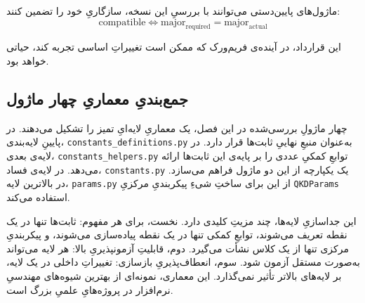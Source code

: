 ماژول‌های پایین‌دستی می‌توانند با بررسیِ این نسخه، سازگاریِ خود را تضمین کنند:
\begin{equation}
	\text{compatible} \iff \text{major}_{\text{required}} = \text{major}_{\text{actual}}
\end{equation}

این قرارداد، در آینده‌ی فریم‌ورک که ممکن است  تغییراتِ اساسی تجربه کند، حیاتی خواهد بود.

\subsection{جمع‌بندیِ معماریِ چهار ماژول}

چهار ماژولِ بررسی‌شده در این فصل، یک معماریِ لایه‌ایِ تمیز را تشکیل می‌دهند. در پایینِ لایه‌بندی، \texttt{constants\_definitions.py} به‌عنوان منبعِ نهاییِ ثابت‌ها قرار دارد. در لایه‌ی بعدی، \texttt{constants\_helpers.py} توابعِ کمکیِ عددی را بر پایه‌ی این ثابت‌ها ارائه می‌دهد. در لایه‌ی فساد، \texttt{constants.py} یک  یکپارچه از این دو ماژول فراهم می‌سازد. در بالاترین لایه، \texttt{params.py} از این  برای ساختِ شیءِ پیکربندیِ مرکزیِ \texttt{QKDParams} استفاده می‌کند.

این جداسازیِ لایه‌ها، چند مزیتِ کلیدی دارد. نخست،  برای هر مفهوم: ثابت‌ها تنها در یک نقطه تعریف می‌شوند، توابعِ کمکی تنها در یک نقطه پیاده‌سازی می‌شوند، و پیکربندیِ مرکزی تنها از یک کلاس نشأت می‌گیرد. دوم، قابلیتِ آزمونپذیریِ بالا: هر لایه می‌تواند به‌صورت مستقل آزمون شود. سوم، انعطاف‌پذیریِ بازسازی: تغییراتِ داخلی در یک لایه، بر لایه‌های بالاتر تأثیر نمی‌گذارد. این معماری، نمونه‌ای از بهترین شیوه‌های مهندسیِ نرم‌افزار در پروژه‌هایِ علمیِ بزرگ است.
